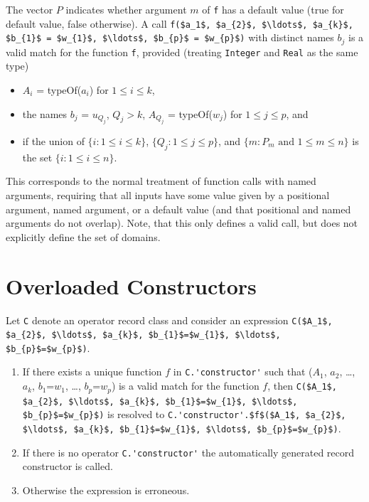 The vector $P$ indicates whether argument $m$ of \lstinline!f! has a default value (true for default value, false otherwise).
A call \lstinline!f($a_1$, $a_{2}$, $\ldots$, $a_{k}$, $b_{1}$ = $w_{1}$, $\ldots$, $b_{p}$ = $w_{p}$)! with distinct names $b_{j}$ is a valid match for the function \lstinline!f!, provided (treating \lstinline!Integer! and \lstinline!Real! as the same type)
\begin{itemize}
\item
  $A_{i}$ = typeOf($a_{i}$) for $1 \leq i \leq k$,
\item
  the names $b_{j}$ = $u_{Q_{j}}$, $Q_{j} > k$, $A_{Q_{j}}$ = typeOf($w_{j}$) for $1 \leq j \leq p$, and
\item
  if the union of $\{i: 1 \leq i \leq k \}$, $\{Q_{j}: 1 \leq j \leq p\}$, and $\{m: P_{m} \text{ and } 1 \leq m \leq n \}$ is the set $\{i: 1 \leq i \leq n\}$.
\end{itemize}

\begin{nonnormative}
This corresponds to the normal treatment of function calls with named arguments, requiring that all inputs have some value given by a positional argument, named argument, or a default value (and that positional and named arguments do not overlap).
Note, that this only defines a valid call, but does not explicitly define the set of domains.
\end{nonnormative}

\section{Overloaded Constructors}\label{overloaded-constructors}

Let \lstinline!C! denote an operator record class and consider an expression \lstinline!C($A_1$, $a_{2}$, $\ldots$, $a_{k}$, $b_{1}$=$w_{1}$, $\ldots$, $b_{p}$=$w_{p}$)!.

\begin{enumerate}
\item\label{overloaded-constructor-unique}
  If there exists a unique function $f$ in \lstinline!C.'constructor'! such that ($A_1$, $a_{2}$, \ldots{}, $a_{k}$, $b_{1}$=$w_{1}$, \ldots{}, $b_{p}$=$w_{p}$) is a valid match for the function $f$, then
  \lstinline!C($A_1$, $a_{2}$, $\ldots$, $a_{k}$, $b_{1}$=$w_{1}$, $\ldots$, $b_{p}$=$w_{p}$)!
  is resolved to
  \lstinline!C.'constructor'.$f$($A_1$, $a_{2}$, $\ldots$, $a_{k}$, $b_{1}$=$w_{1}$, $\ldots$, $b_{p}$=$w_{p}$)!.
\item
  If there is no operator \lstinline!C.'constructor'! the automatically generated record constructor is called.
\item
  Otherwise the expression is erroneous.
\end{enumerate}

